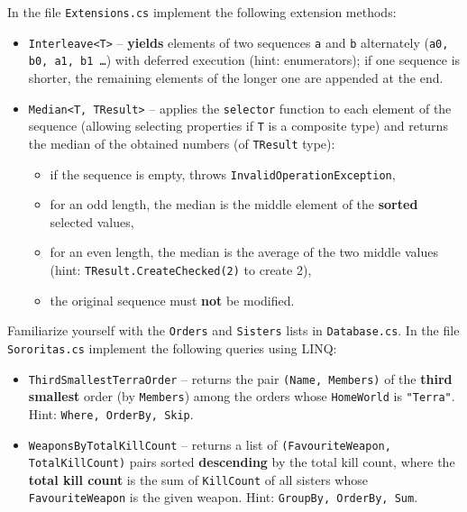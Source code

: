 \documentclass[11pt,a4paper,addpoints]{exam}
\renewcommand*\half{.5}
\begin{document}
\begin{questions}
\question[2] In the file \texttt{Extensions.cs} implement the following extension methods:
\begin{itemize}
    \item \texttt{Interleave<T>} -- \textbf{yields} elements of two sequences \texttt{a} and \texttt{b} alternately
    (\texttt{a0, b0, \break a1, b1 \dots}) with deferred execution (hint: enumerators); if one sequence is shorter, the remaining elements of the longer one are appended at the end.
    \item \texttt{Median<T, TResult>} -- applies the \texttt{selector} function to each element of the sequence (allowing selecting properties if \texttt{T} is a composite type) and returns the median of the obtained numbers (of \texttt{TResult} type):
    \begin{itemize}
        \item if the sequence is empty, throws \texttt{InvalidOperationException},
        \item for an odd length, the median is the middle element of the \textbf{sorted} selected values,
        \item for an even length, the median is the average of the two middle values \break
        (hint: \texttt{TResult.CreateChecked(2)} to create 2),
        \item the original sequence must \textbf{not} be modified.
    \end{itemize}
\end{itemize}

\question[1\half] Familiarize yourself with the \texttt{Orders} and \texttt{Sisters} lists in \texttt{Database.cs}. In the file \texttt{Sororitas.cs} implement the following queries using LINQ:
\begin{itemize}
    \item \texttt{ThirdSmallestTerraOrder} -- returns the pair \texttt{(Name, Members)} of the \textbf{third smallest} order (by \texttt{Members}) among the orders whose \texttt{HomeWorld} is \texttt{"Terra"}.\newline
    Hint: \texttt{Where, OrderBy, Skip}.
    \item \texttt{WeaponsByTotalKillCount} -- returns a list of \texttt{(FavouriteWeapon, TotalKillCount)} pairs sorted \textbf{descending} by the total kill count, where the \textbf{total kill count} is the sum of \texttt{KillCount} of all sisters whose \texttt{FavouriteWeapon} is the given weapon.\newline
    Hint: \texttt{GroupBy, OrderBy, Sum}.
\end{itemize}

\end{questions}
\end{document}
